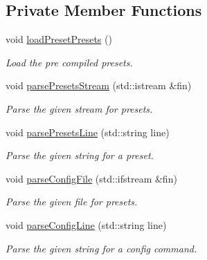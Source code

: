 \subsection*{Private Member Functions}
\begin{DoxyCompactItemize}
\item 
\mbox{\label{classConfig_ab3f3b04d3ab2602141212c1af509b808}} 
void \hyperlink{classConfig_ab3f3b04d3ab2602141212c1af509b808}{load\+Preset\+Presets} ()
\begin{DoxyCompactList}\small\item\em Load the pre compiled presets. \end{DoxyCompactList}\item 
\mbox{\label{classConfig_ad05fb468c16ec451652abb2de179caf5}} 
void \hyperlink{classConfig_ad05fb468c16ec451652abb2de179caf5}{parse\+Presets\+Stream} (std\+::istream \&fin)
\begin{DoxyCompactList}\small\item\em Parse the given stream for presets. \end{DoxyCompactList}\item 
void \hyperlink{classConfig_a9f578681efe13ea4c4baca735f6b3c6e}{parse\+Presets\+Line} (std\+::string line)
\begin{DoxyCompactList}\small\item\em Parse the given string for a preset. \end{DoxyCompactList}\item 
\mbox{\label{classConfig_a6c2a4d8a853cbcc51825d3cb0c96ff61}} 
void \hyperlink{classConfig_a6c2a4d8a853cbcc51825d3cb0c96ff61}{parse\+Config\+File} (std\+::ifstream \&fin)
\begin{DoxyCompactList}\small\item\em Parse the given file for presets. \end{DoxyCompactList}\item 
void \hyperlink{classConfig_a9a85fd4fb07775bccf974a83645159e2}{parse\+Config\+Line} (std\+::string line)
\begin{DoxyCompactList}\small\item\em Parse the given string for a config command. \end{DoxyCompactList}\end{DoxyCompactItemize}
